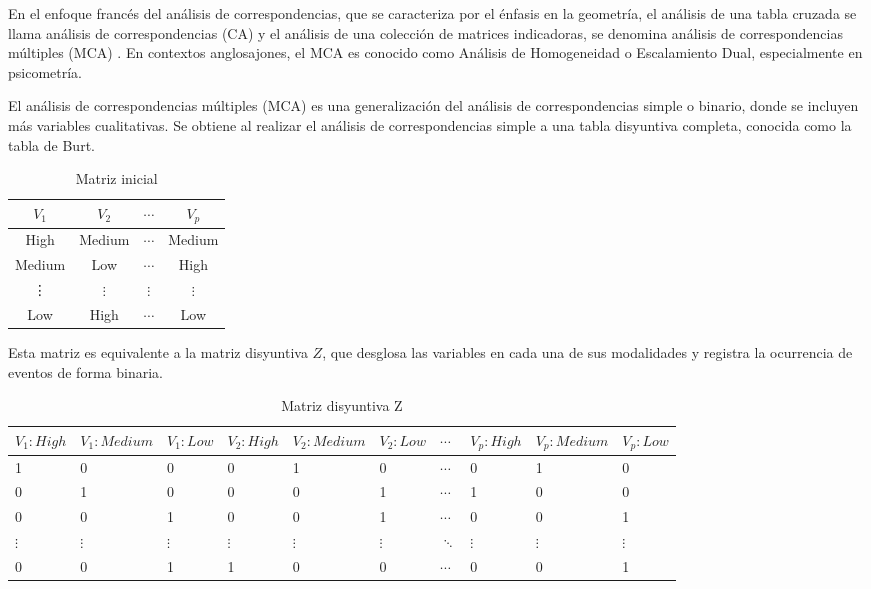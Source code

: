 \documentclass[mathematics,article,submit,moreauthors,pdftex]{mdpi}
\begin{document}
En el enfoque francés del análisis de correspondencias, que se
caracteriza por el énfasis en la geometría, el análisis de una tabla
cruzada se llama análisis de correspondencias (CA) y el análisis de una
colección de matrices indicadoras, se denomina análisis de
correspondencias múltiples (MCA) \citep{michailidis1998}. En contextos
anglosajones, el MCA es conocido como Análisis de Homogeneidad o
Escalamiento Dual, especialmente en psicometría.

El análisis de correspondencias múltiples (MCA) es una generalización
del análisis de correspondencias simple o binario, donde se incluyen más
variables cualitativas. Se obtiene al realizar el análisis de
correspondencias simple a una tabla disyuntiva completa, conocida como
la tabla de Burt.

\begin{table}[!ht]
\begin{center}
 \begin{tabular}{||c c c c||} 
 \hline
 $V_{1}$ & $V_{2}$ & $\cdots$ & $V_{p}$ \\ [0.5ex] 
 \hline\hline
 High & Medium & $\cdots$ & Medium\\
 \hline
Medium & Low & $\cdots$ & High\\
\hline
\vdots & $\vdots$ & $\vdots$ & $\vdots$\\
\hline
Low & High & $\cdots$ & Low \\ [1ex] 
 \hline
\end{tabular}\caption{Matriz inicial}
\label{tab:inicial}
\end{center}
\end{table}

Esta matriz es equivalente a la matriz disyuntiva \(Z\), que desglosa
las variables en cada una de sus modalidades y registra la ocurrencia de
eventos de forma binaria.

\begin{table}[!ht]
\begin{center}
 \begin{tabular}{||p{1cm}p{1cm}p{1cm}||p{1cm}p{1cm} p{1cm} ||p{1cm} ||p{1cm} p{1cm} p{1cm} ||} 
 \hline
 $V_{1}:High$ &$V_{1}:Medium$ &$V_{1}:Low$ & $V_{2}:High$ & $V_{2}:Medium$ & $V_{2}:Low$ & $\cdots$ & $V_{p}:High$ & $V_{p}:Medium$ & $V_{p}:Low$ \\ [0.5ex] 
 \hline\hline
 1 & 0 & 0 & 0 & 1 & 0 & $\cdots$ & 0 & 1 & 0 \\ [0.2ex] 
 \hline
 0 & 1 & 0 & 0 & 0 & 1 & $\cdots$ & 1 & 0 & 0 \\ 
\hline
 0 & 0 & 1 & 0 & 0 &  1 & $\cdots$ & 0 & 0 & 1 \\ 
\hline
 $\vdots$ & $\vdots$ & $\vdots$ & $\vdots$ & $\vdots$ &  $\vdots$ & $\ddots$ & $\vdots$ & $\vdots$ & $\vdots$ \\ 
\hline
 0 & 0 & 1 & 1 & 0 & 0 & $\cdots$ & 0 & 0 & 1 \\  
 \hline
\end{tabular}
\caption{Matriz disyuntiva Z}
\label{tab:z}
\end{center}
\end{table}
\end{document}
